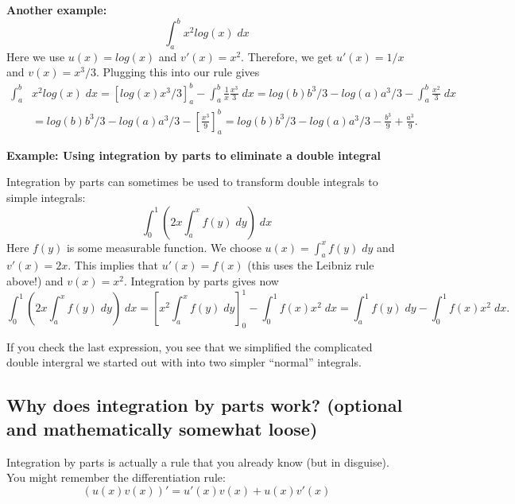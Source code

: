 \documentclass[a4paper,12pt]{article}
\theoremstyle{plain}
\begin{document}
\textbf{Another example: }
\begin{equation*}
  \int_a^b x^2 log(x)\;dx
\end{equation*}
Here we use $u(x)=log(x)$ and $v'(x)=x^2$. Therefore, we get $u'(x)=1/x$ and $v(x)=x^3/3$. Plugging this into our rule gives
\begin{align*}
  \int_a^b &x^2 log(x)\;dx=\left[log(x)x^3/3\right]_a^b- \int_a^b\frac{1}{x}\frac{x^3}{3}\;dx=log(b)b^3/3-log(a)a^3/3-\int_a^b\frac{x^2}{3}\;dx\\
&=log(b)b^3/3-log(a)a^3/3-\left[\frac{x^3}{9}\right]_a^b=log(b)b^3/3-log(a)a^3/3-\frac{b^3}{9}+\frac{a^3}{9}.
\end{align*}

\textbf{Example: Using integration by parts to eliminate a double integral}

Integration by parts can sometimes be used to transform double integrals to simple integrals:
\begin{equation*}
  \int_0^1\left(2x \int_a^x f(y)\;dy\right)\;dx
\end{equation*}
Here $f(y)$ is some measurable function. We choose $u(x)=\int_a^xf(y)\;dy$ and $v'(x)=2x$. This implies that $u'(x)=f(x)$ (this uses the Leibniz rule above!) and $v(x)=x^2$. Integration by parts gives now
\begin{equation*}
  \int_0^1\left(2x \int_a^x f(y)\;dy\right)\;dx= \left[x^2 \int_a^x f(y)\;dy\right]_0^1-\int_0^1f(x) x^2\;dx=\int_a^1f(y)\;dy-\int_0^1f(x)x^2\;dx.
\end{equation*}

If you check the last expression, you see that we simplified the complicated double intergral we started out with into two simpler ``normal'' integrals.


\subsection{Why does integration by parts work? (optional and mathematically somewhat loose)}
\label{sec:why-doe-sintegration}
Integration by parts is actually a rule that you already know (but in disguise). You might remember the differentiation rule:
\begin{equation*}
  \left(u(x) v(x)\right)'=u'(x)v(x)+u(x)v'(x)
\end{equation*}
\end{document}
